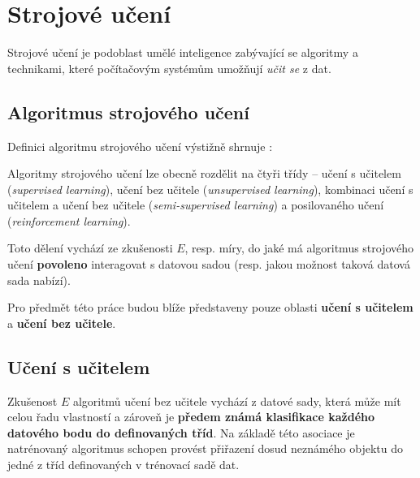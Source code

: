 \section{Strojové učení}
Strojové učení je podoblast umělé inteligence zabývající se algoritmy a technikami, které počítačovým systémům umožňují \emph{učit se} z dat.
\begin{definition}
    \label{def:machine_learning}
     \cite{Samuel1967}
\end{definition}
\subsection{Algoritmus strojového učení}
\label{sec:machine_learning_algorithm}
Definici algoritmu strojového učení výstižně shrnuje \textcite[str. 2]{Mitchell1997}:
\begin{definition}
    \label{def:machine_learning_algorithm}
\end{definition}
Algoritmy strojového učení lze obecně rozdělit na čtyři třídy – učení s učitelem (\emph{supervised learning}),
učení bez učitele (\emph{unsupervised learning}), kombinaci učení s učitelem a učení bez učitele (\emph{semi-supervised learning}) a posilovaného učení (\emph{reinforcement learning}).

Toto dělení vychází ze zkušenosti $E$, resp. míry, do jaké má algoritmus strojového učení \textbf{povoleno} interagovat s datovou sadou (resp. jakou možnost taková datová sada nabízí). \cite{Goodfellow2016}

Pro předmět této práce budou blíže představeny pouze oblasti \textbf{učení s učitelem} a \textbf{učení bez učitele}.
\subsection{Učení s učitelem}
\label{sec:supervised_learning}
Zkušenost $E$ algoritmů učení bez učitele vychází z datové sady, která může mít celou řadu vlastností a zároveň je \textbf{předem známá klasifikace každého datového bodu do definovaných tříd}.
Na základě této asociace je natrénovaný algoritmus schopen provést přiřazení dosud neznámého objektu do jedné z tříd definovaných v trénovací sadě dat. \cite{Chollet2017}

